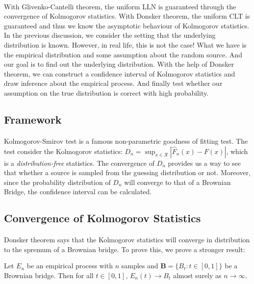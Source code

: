\documentclass[final_project_1.tex]{subfiles}
\begin{document}
\paragraph{}
With Glivenko-Cantelli theorem, the uniform LLN is guaranteed through the convergence of Kolmogorov statistics. With Donsker theorem, the uniform CLT is guaranteed and thus we know the asymptotic behaviour of Kolmogorov statistics. In the previous discussion, we consider the setting that the underlying distribution is known. However, in real life, this is not the case! What we have is the empirical distribution and some assumption about the random source. And our goal is to find out the underlying distribution. With the help of Donsker theorem, we can construct a confidence interval of Kolmogorov statistics and draw inference about the empirical process. And finally test whether our assumption on the true distribution is correct with high probability.

\subsection{Framework}

\paragraph{}
Kolmogorov-Smirov test is a famous non-parametric goodness of fitting test. The test consider the Kolmogorov statistics: $D_n = \sup_{x\in \mathcal{R}}|\hat{F}_n(x)-F(x)|$, which is a {\it distribution-free} statistics. The convergence of $D_n$ provides us a way to see that whether a source is sampled from the guessing distribution or not. Moreover, since the probability distribution of $D_n$ will converge to that of a Brownian Bridge, the confidence interval can be calculated.


\subsection{Convergence of Kolmogorov Statistics}

\paragraph{}
Donsker theorem says that the Kolmogorov statistics will converge in distribution to the spremum of a Brownian bridge. To prove this, we prove a stronger result:
\begin{theorem}
Let $E_n$ be an empirical process with $n$ samples and $\mathbf{B}=\{B_t:t\in[0,1]\}$ be a Brownian bridge. Then for all $t\in[0,1]$, $E_n(t)\rightarrow B_t$ almost surely as $n\rightarrow\infty$.
\end{theorem}
\end{document}
